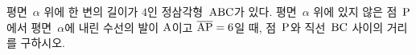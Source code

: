 평면~$\alpha$ 위에 한 변의 길이가 $4$인 정삼각형~$\mathrm{ABC}$가 있다. 평면~$\alpha$ 위에 있지 않은 점~$\mathrm{P}$에서 평면~$\alpha$에 내린 수선의 발이 $\mathrm{A}$이고 $\overline{\mathrm{AP}}=6$일 때, 점~$\mathrm{P}$와 직선~$\mathrm{BC}$ 사이의 거리를 구하시오.
